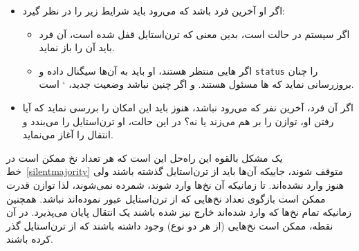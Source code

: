 \documentclass{book}
\begin{document}
\begin{itemize}

\item %
    اگر او آخرین فرد  باشد که می‌رود باید شرایط زیر را در نظر گیرد: 

    \begin{itemize}

    \item %
        اگر سیستم در حالت  است، بدین معنی که ترن‌استایل   قفل شده است، آن فرد باید آن را باز نماید. 

    \item %
    اگر هایی منتظر هستند، او باید به آن‌ها سیگنال داده و {\tt status}  را چنان بروزرسانی نماید که ها 
    مسئول هستند. و اگر چنین نباشد وضعیت جدید،       ` است. 

    \end{itemize}  

\item %
    اگر آن فرد، آخرین نفر   که می‌رود نباشد، هنوز باید این امکان را بررسی نماید که آیا رفتن او، توازن را بر هم می‌زند یا نه؟ 
    در این حالت، او ترن‌استایل  را می‌بندد و انتقال را آغاز می‌نماید. 

\end{itemize}

    

    
    یک مشکل بالقوه این راه‌حل این است که هر تعداد نخ‌ ممکن است در خط~\ref{silentmajority} متوقف شوند، جاییکه آن‌ها 
    باید از ترن‌استایل گذشته باشند ولی هنوز وارد نشده‌اند. تا زمانیکه آن‌ نخ‌ها وارد شوند، شمرده نمی‌شوند، لذا توازن قدرت ممکن است 
    بازگوی تعداد نخ‌هایی که از ترن‌استایل عبور نموده‌اند نباشد. همچنین زمانیکه تمام نخ‌ها که وارد شده‌اند خارج نیز شده باشند یک انتقال 
    پایان می‌پذیرد. در آن نقطه، ممکن است نخ‌هایی (از هر دو نوع) وجود داشته باشند که از ترن‌استایل گذر کرده باشند. 
    
\end{document}
